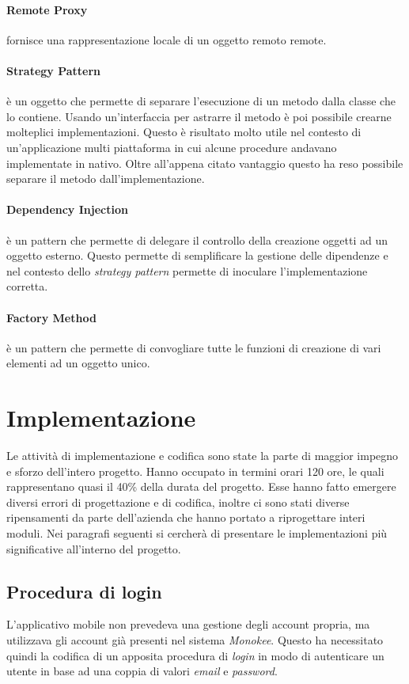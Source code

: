 \paragraph{Remote Proxy} fornisce una rappresentazione locale di un oggetto remoto remote. 
\paragraph{Strategy Pattern} è un oggetto che permette di separare l’esecuzione di un metodo dalla classe che lo contiene. Usando un’interfaccia per astrarre il metodo è poi possibile crearne molteplici implementazioni. Questo è risultato molto utile nel contesto di un’applicazione multi piattaforma in cui alcune procedure andavano implementate in nativo. Oltre all’appena citato vantaggio questo ha reso possibile separare il metodo dall’implementazione. 
\paragraph{Dependency Injection} è un pattern che permette di delegare il controllo della creazione oggetti ad un oggetto esterno. Questo permette di semplificare la gestione delle dipendenze e nel contesto dello \emph{strategy pattern} permette di inoculare l’implementazione corretta. 
\paragraph{Factory Method} è un pattern che permette di convogliare tutte le funzioni di creazione di vari elementi ad un oggetto unico. 

\section{Implementazione}

Le attività di implementazione e codifica sono state la parte di maggior impegno e sforzo dell'intero progetto. Hanno occupato in termini orari 120 ore, le quali rappresentano quasi il 40\% della durata del progetto. Esse hanno fatto emergere diversi errori di progettazione e di codifica, inoltre ci sono stati diverse ripensamenti da parte dell'azienda che hanno portato a riprogettare interi moduli. Nei paragrafi seguenti si cercherà di presentare le implementazioni più significative all'interno del progetto.

\subsection{Procedura di login}
L'applicativo mobile non prevedeva una gestione degli account propria, ma utilizzava gli account già presenti nel sistema \emph{Monokee}. Questo ha necessitato quindi la codifica di un apposita procedura di \emph{login} in modo di autenticare un utente in base ad una coppia di valori \emph{email} e \emph{password}. 

